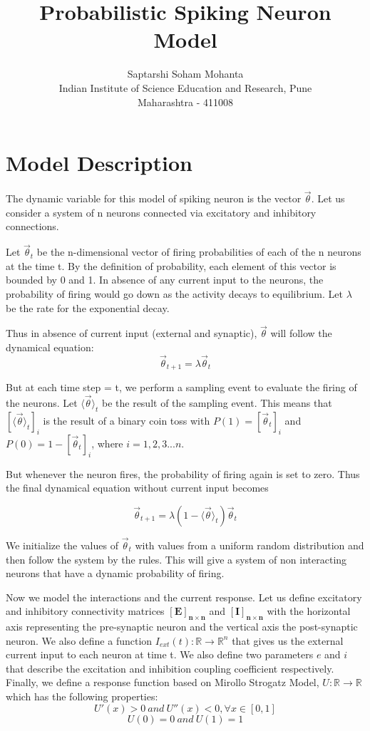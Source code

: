 \documentclass[a4paper,12pt]{article}
\title{Probabilistic Spiking Neuron Model}
\author{Saptarshi Soham Mohanta\\
Indian Institute of Science Education and Research, Pune\\
Maharashtra - 411008}
\begin{document}
\maketitle

\section*{Model Description}
The dynamic variable for this model of spiking neuron is the vector $\vec{\theta}$. Let us consider a system of n neurons connected via excitatory and inhibitory connections.

Let $\vec{\theta}_t$ be the n-dimensional vector of firing probabilities of each of the n neurons at the time t. By the definition of probability, each element of this vector is bounded by 0 and 1. In absence of any current input to the neurons, the probability of firing would go down as the activity decays to equilibrium. Let $\lambda$ be the rate for the exponential decay.

Thus in absence of current input (external and synaptic), $\vec{\theta}$ will follow the dynamical equation:
$$\vec{\theta}_{t+1} = \lambda \vec{\theta}_t$$

But at each time step = t, we perform a sampling event to evaluate the firing of the neurons. Let $\langle\vec{\theta}\rangle_t$ be the result of the sampling event. This means that  $[\langle\vec{\theta}\rangle_t]_i$ is the result of a binary coin toss with $P(1) = [\vec{\theta}_t]_i$ and $P(0) = 1-[\vec{\theta}_t]_i$, where $i = 1,2,3...n$.

But whenever the neuron fires, the probability of firing again is set to zero. Thus the final dynamical equation without current input becomes

$$\vec{\theta}_{t+1} = \lambda (1-\langle\vec{\theta}\rangle_t) \vec{\theta}_t$$

We initialize the values of $\vec{\theta}_t$ with values from a uniform random distribution and then follow the system by the rules. This will give a system of non interacting neurons that have a dynamic probability of firing. 

Now we model the interactions and the current response. Let us define excitatory and inhibitory connectivity matrices $\mathbf{[E]_{n\times n}}$ and  $\mathbf{[I]_{n\times n}}$ with the horizontal axis representing the pre-synaptic neuron and the vertical axis the post-synaptic neuron. We also define a function $I_{ext}(t):\mathbb{R}\rightarrow\mathbb{R}^n$ that gives us the external current input to each neuron at time t. We also define two parameters $e$ and $i$ that describe the excitation and inhibition coupling coefficient respectively. Finally, we define a response function based on Mirollo Strogatz Model, $U:\mathbb{R}\rightarrow\mathbb{R}$ which has the following properties:
$$U'(x)>0\ and\ U''(x)<0,\forall x \in [0,1]$$
$$U(0)=0\ and\ U(1)=1$$
\end{document}

